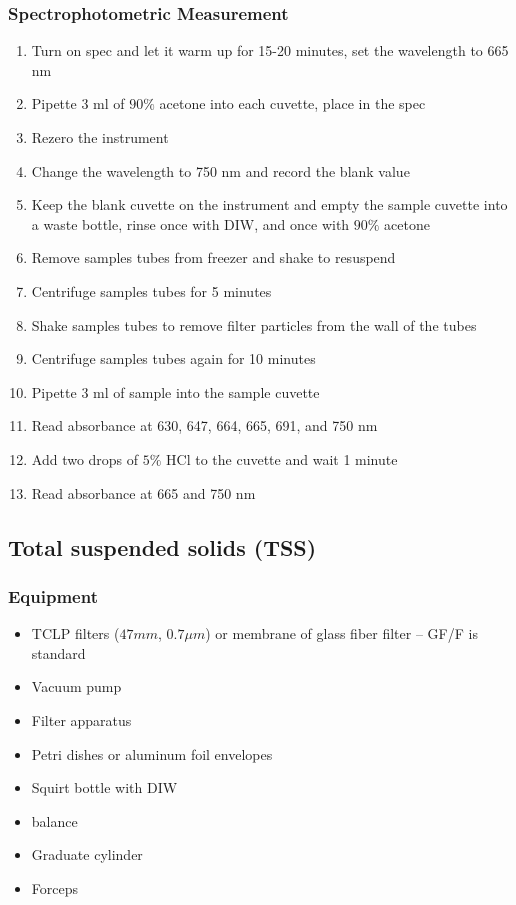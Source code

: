 \begin{appendices}
\subsubsection*{Spectrophotometric Measurement}
\begin{enumerate}
  \item Turn on spec and let it warm up for 15-20 minutes, set the wavelength to 665 nm
  \item Pipette 3 ml of $90\%$ acetone into each cuvette, place in the spec
  \item Rezero the instrument
  \item Change the wavelength to 750 nm and record the blank value
  \item Keep the blank cuvette on the instrument and empty the sample cuvette into a waste bottle, rinse once with DIW, and once with $90\%$ acetone
  \item Remove samples tubes from freezer and shake to resuspend
  \item Centrifuge samples tubes for 5 minutes
  \item Shake samples tubes to remove filter particles from the wall of the tubes
  \item Centrifuge samples tubes again for 10 minutes
  \item Pipette 3 ml of sample into the sample cuvette
  \item Read absorbance at 630, 647, 664, 665, 691, and 750 nm
  \item Add two drops of $5\%$ HCl to the cuvette and wait 1 minute
  \item Read absorbance at 665 and 750 nm
\end{enumerate}


\subsection{Total suspended solids (TSS)}

\subsubsection{Equipment}
\begin{itemize}[itemsep=2pt,parsep=2pt]

  \item TCLP filters ($47 mm$, $0.7\mu m$) or membrane of glass fiber filter -- GF/F is standard
  \item Vacuum pump
  \item Filter apparatus
  \item Petri dishes or aluminum foil envelopes
  \item Squirt bottle with DIW
  \item balance
  \item Graduate cylinder
  \item Forceps


\end{itemize}
\end{appendices}
